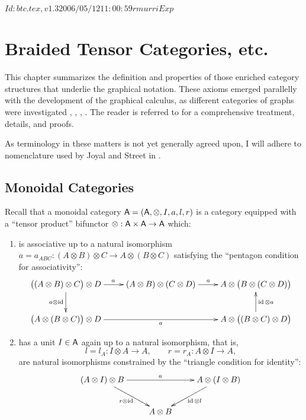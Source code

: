 \RCSID $Id: btc.tex,v 1.3 2006/05/12 11:00:59 rmurri Exp $


\chapter{Braided Tensor Categories, etc.}
\label{cha:btc}

This chapter summarizes the definition and properties of those
enriched category structures that underlie the graphical notation.
These axioms emerged parallelly with the development of the graphical
calculus, as different categories of graphs were investigated
\cite{turaev;yang-baxter}, \cite{freyd-yetter;btc},
\cite{joyal-street;tensor-calculus}, \cite{shum;tortile-categories}.
The reader is referred to \cite{joyal-street;btc} for a comprehensive
treatment, details, and proofs.

As terminology in these matters is not yet generally agreed upon, I
will adhere to nomenclature used by Joyal and Street in
\cite{joyal-street;tensor-calculus, joyal-street;btc}. 


\section{Monoidal Categories}
\label{sec:monoidal-categories}

Recall that a monoidal category $\mathsf{A} = (\mathsf{A}, \otimes, I, a, l, r)$ is a
category equipped with a ``tensor product'' bifunctor $\otimes: \mathsf{A} \times \mathsf{A} \to
\mathsf{A}$ which:
\begin{enumerate}
\item is associative up to a natural isomorphism $a = a_{ABC}:
  (A\otimes B)\otimes C \to A\otimes(B\otimes C)$ satisfying the ``pentagon condition for
  associativity'': 
  \begin{equation*}
    \xymatrix{%
      \bigl((A\otimes B)\otimes C\bigr)\otimes D
      &
      (A\otimes B) \otimes (C\otimes D)
      &
      A \otimes \bigl(B\otimes(C\otimes D)\bigr)
      \\
      \bigl(A\otimes(B\otimes C)\bigr) \otimes D
      &
      &
      A\otimes\bigl((B\otimes C)\otimes D\bigr)
      \ar "1,1";"1,2"^{a}
      \ar "1,2";"1,3"^{a}
      \ar "1,1";"2,1"_{a \otimes \id}
      \ar "2,1";"2,3"_{a}
      \ar "2,3";"1,3"_{\id \otimes a}
      }
  \end{equation*}
\item has a unit $I \in \mathsf{A}$ again up to a natural isomorphism, that is,
  \begin{equation*}
    l = l_A: I \otimes A \to A, \qquad r = r_A: A \otimes I \to A,
  \end{equation*}
  are natural isomorphisms constrained by the ``triangle condition for
  identity'':
  \begin{equation*}
    \xymatrix{%
      (A \otimes I) \otimes B
      &
      &
      A \otimes (I \otimes B)
      \\
      &
      A \otimes B
      &
      \ar "1,1";"1,3"^{a}
      \ar "1,1";"2,2"_{r \otimes \id}
      \ar "1,3";"2,2"^{\id \otimes l}
      }
  \end{equation*}
\end{enumerate}

